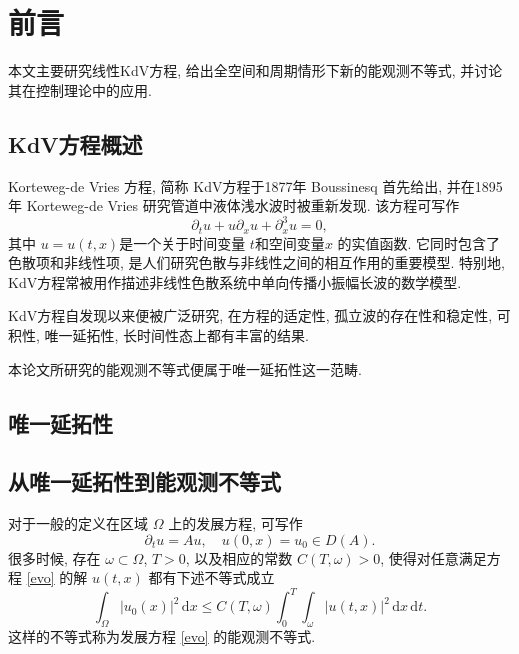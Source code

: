 \documentclass[master]{cugthesis}
\renewcommand\d{\ensuremath{\,\mathrm{d}}}
\begin{document}
    \makefrontpages 
    \chapter{前言}
    本文主要研究线性KdV方程, 给出全空间和周期情形下新的能观测不等式, 并讨论其在控制理论中的应用.
    \section{KdV方程概述}
    Korteweg-de Vries 方程, 简称 KdV方程于1877年 Boussinesq\cite{Bouss1877} 首先给出, 并在1895年 Korteweg-de Vries\cite{Kort1895} 研究管道中液体浅水波时被重新发现. 该方程可写作
    \begin{equation}
        \partial_t u +u \partial_x u +\partial_x^3 u =0,\label{kdv}
    \end{equation}
    其中 $u=u(t,x)$是一个关于时间变量 $t$和空间变量$x$ 的实值函数. 它同时包含了色散项和非线性项, 是人们研究色散与非线性之间的相互作用的重要模型. 特别地, KdV方程常被用作描述非线性色散系统中单向传播小振幅长波的数学模型.
    
    KdV方程自发现以来便被广泛研究, 在方程的适定性, 孤立波的存在性和稳定性, 可积性, 唯一延拓性, 长时间性态上都有丰富的结果. 
    
    本论文所研究的能观测不等式便属于唯一延拓性这一范畴.
    
    \section{唯一延拓性}
    
    \section{从唯一延拓性到能观测不等式}
    对于一般的定义在区域 $\Omega$ 上的发展方程, 可写作
    \begin{equation}\label{evo}
        \partial_t u = A u, \quad u(0,x)=u_0\in D(A).
    \end{equation}
    很多时候, 存在 $\omega\subset \Omega$, $T>0$, 以及相应的常数 $C(T,\omega)>0$, 使得对任意满足方程 \eqref{evo} 的解 $u(t,x)$ 都有下述不等式成立
    \begin{equation}\label{init}
        \int_{\Omega}|u_0(x)|^2\d x\le C(T,\omega)\int_0^T\int_\omega|u(t,x)|^2\d x\d t.
    \end{equation}
    这样的不等式称为发展方程 \eqref{evo} 的能观测不等式. 
\end{document}
